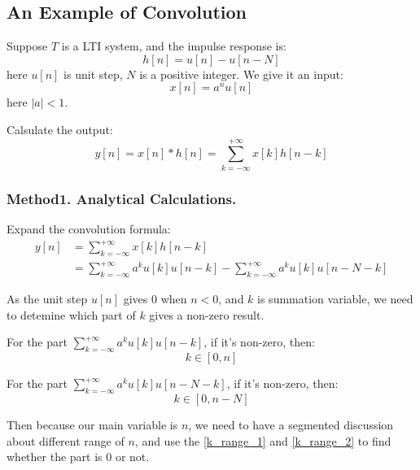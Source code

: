     \subsection{An Example of Convolution}
    Suppose $T$ is a LTI system, and the impulse response is:
        \begin{equation}
            h[n] = u[n] - u[n-N]
        \end{equation}
    here $u[n]$ is unit step, $N$ is a positive integer.
    We give it an input:
        \begin{equation}
            x[n] = a^nu[n]
        \end{equation}
    here $|a|<1$.

    Calsulate the output:
        \begin{equation}
            y[n] = x[n] \ast h[n] = \sum_{k=-\infty}^{+\infty} x[k]h[n-k]
        \end{equation}
    
    \subsubsection{Method1. Analytical Calculations.}

    Expand the convolution formula:
        \begin{equation}
            \begin{aligned}
            y[n] &= \sum_{k=-\infty}^{+\infty} x[k]h[n-k]\\
                 &= \sum_{k=-\infty}^{+\infty} a^ku[k]u[n-k] - \sum_{k=-\infty}^{+\infty}a^ku[k]u[n-N-k]
            \end{aligned}
        \end{equation}
    
    As the unit step $u[n]$ gives 0 when $n<0$, and $k$ is summation variable, we need to detemine which part of $k$ gives a non-zero result.

    For the part $\sum_{k=-\infty}^{+\infty} a^ku[k]u[n-k]$, if it's non-zero, then:
        \begin{equation} \label{k_range_1}
            k \in [0,n]
        \end{equation}

    For the part $\sum_{k=-\infty}^{+\infty} a^ku[k]u[n-N-k]$, if it's non-zero, then:
        \begin{equation}\label{k_range_2}
            k \in [0,n-N]
        \end{equation}
    
    Then because our main variable is $n$, we need to have a segmented discussion about different range of $n$, 
    and use the \eqref{k_range_1} and \eqref{k_range_2} to find whether the part is 0 or not.

